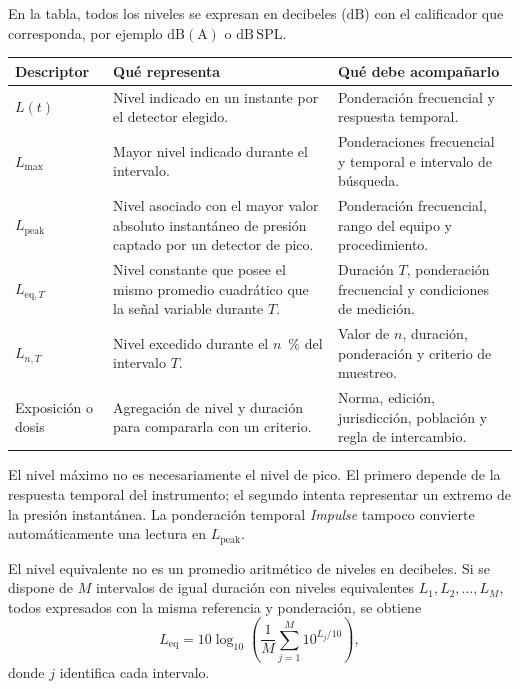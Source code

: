 En la tabla, todos los niveles se expresan en decibeles (\(\mathrm{dB}\)) con
el calificador que corresponda, por ejemplo \(\mathrm{dB(A)}\) o
\(\mathrm{dB\,SPL}\).

\begin{center}
\small
\begin{tabular}{|
    >{\raggedright\arraybackslash}p{}|
    >{\raggedright\arraybackslash}p{}|
    >{\raggedright\arraybackslash}p{}|}
    \hline
    \textbf{Descriptor} & \textbf{Qué representa} &
    \textbf{Qué debe acompañarlo} \\
    \hline
    \(L(t)\) & Nivel indicado en un instante por el detector elegido. &
    Ponderación frecuencial y respuesta temporal. \\
    \hline
    \(L_{\mathrm{max}}\) & Mayor nivel indicado durante el intervalo. &
    Ponderaciones frecuencial y temporal e intervalo de búsqueda. \\
    \hline
    \(L_{\mathrm{peak}}\) & Nivel asociado con el mayor valor absoluto
    instantáneo de presión captado por un detector de pico. &
    Ponderación frecuencial, rango del equipo y procedimiento. \\
    \hline
    \(L_{\mathrm{eq},T}\) & Nivel constante que posee el mismo promedio
    cuadrático que la señal variable durante \(T\). &
    Duración \(T\), ponderación frecuencial y condiciones de medición. \\
    \hline
    \(L_{n,T}\) & Nivel excedido durante el \(n\)~\% del intervalo \(T\). &
    Valor de \(n\), duración, ponderación y criterio de muestreo. \\
    \hline
    Exposición o dosis & Agregación de nivel y duración para compararla con
    un criterio. & Norma, edición, jurisdicción, población y regla de
    intercambio. \\
    \hline
\end{tabular}
\end{center}

El nivel máximo no es necesariamente el nivel de pico. El primero depende de
la respuesta temporal del instrumento; el segundo intenta representar un
extremo de la presión instantánea. La ponderación temporal \emph{Impulse}
tampoco convierte automáticamente una lectura en \(L_{\mathrm{peak}}\).

El nivel equivalente no es un promedio aritmético de niveles en decibeles. Si
se dispone de \(M\) intervalos de igual duración con niveles equivalentes
\(L_1,L_2,\ldots,L_M\), todos expresados con la misma referencia y
ponderación, se obtiene
\begin{equation}
    L_{\mathrm{eq}}=
    10\log_{10}\left(
    \frac{1}{M}\sum_{j=1}^{M}10^{L_j/10}
    \right),
    \label{eq:u10-leq-intervalos}
\end{equation}
donde \(j\) identifica cada intervalo.

